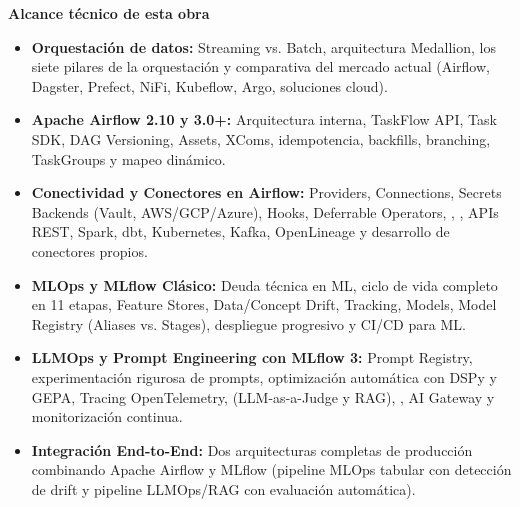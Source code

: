 \begin{titlepage}
\begin{minipage}{0.94\textwidth}
  \begin{tcolorbox}[
    enhanced, colback=SoftBg, colframe=LightBorder, boxrule=0.6pt, arc=3pt,
    left=10pt, right=10pt, top=8pt, bottom=8pt
  ]
  {\sffamily\bfseries\small\color{PrimaryDark}Alcance técnico de esta obra}\\[3pt]
  \footnotesize
  \begin{itemize}[leftmargin=1.2em, itemsep=2.5pt]
    \item \textbf{Orquestación de datos:} Streaming vs. Batch, arquitectura Medallion, los siete pilares de la orquestación y comparativa del mercado actual (Airflow, Dagster, Prefect, NiFi, Kubeflow, Argo, soluciones cloud).
    \item \textbf{Apache Airflow 2.10 y 3.0+:} Arquitectura interna, TaskFlow API, Task SDK, DAG Versioning, Assets, XComs, idempotencia, backfills, branching, TaskGroups y mapeo dinámico.
    \item \textbf{Conectividad y Conectores en Airflow:} Providers, Connections, Secrets Backends (Vault, AWS/GCP/Azure), Hooks, Deferrable Operators, , , APIs REST, Spark, dbt, Kubernetes, Kafka, OpenLineage y desarrollo de conectores propios.
    \item \textbf{MLOps y MLflow Clásico:} Deuda técnica en ML, ciclo de vida completo en 11 etapas, Feature Stores, Data/Concept Drift, Tracking, Models, Model Registry (Aliases vs. Stages), despliegue progresivo y CI/CD para ML.
    \item \textbf{LLMOps y Prompt Engineering con MLflow 3:} Prompt Registry, experimentación rigurosa de prompts, optimización automática con DSPy y GEPA, Tracing OpenTelemetry,  (LLM-as-a-Judge y RAG), , AI Gateway y monitorización continua.
    \item \textbf{Integración End-to-End:} Dos arquitecturas completas de producción combinando Apache Airflow y MLflow (pipeline MLOps tabular con detección de drift y pipeline LLMOps/RAG con evaluación automática).
  \end{itemize}
  \end{tcolorbox}
\end{minipage}

\vfill


\end{titlepage}
